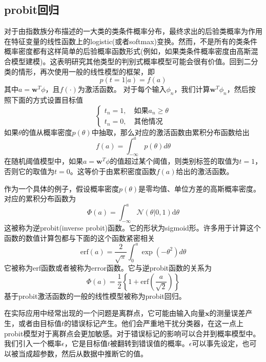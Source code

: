 \subsection*{probit回归}
对于由指数族分布描述的一大类的类条件概率分布，最终求出的后验类概率为作用在特征变量的线性函数上的logistic(或者softmax)变换。然而，不是所有的类条件概率密度都有这样简单的后验概率函数形式(例如，如果类条件概率密度由高斯混合模型建模)。这表明研究其他类型的判别式概率模型可能会很有价值。回到二分类的情形，再次使用一般的线性模型的框架，即
\begin{equation}
	p(t=1|a)=f(a)
\end{equation}
其中$a=\boldsymbol{w}^T\phi$，且$f(\cdot)$为激活函数。
对于每个输入$\phi_n$，我们计算$\boldsymbol{w}^T\phi_n$，然后按照下面的方式设置目标值
\begin{equation}
	\begin{cases}
	t_n=1,\quad \text{如果}a_n\geqslant \theta\\
	t_n=0,\quad \text{其他情况}
	\end{cases}
\end{equation}
如果$\theta$的值从概率密度$p(\theta)$中抽取，那么对应的激活函数由累积分布函数给出
\begin{equation}
	f(a)=\int_{-\infty}^ap(\theta)d\theta
\end{equation}
在随机阈值模型中，如果$a=\boldsymbol{w}^T\phi$的值超过某个阈值，则类别标签的取值为$t=1$，否则它的取值为$t=0$。这等价于由累积密度函数$f(a)$给出的激活函数。

作为一个具体的例子，假设概率密度$p(\theta)$是零均值、单位方差的高斯概率密度。对应的累积分布函数为
\begin{equation}
	\Phi(a)=\int_{-\infty}^{a}\mathcal{N}(\theta |0,1)\mathrm{d}\theta 
\end{equation}
这被称为逆probit(inverse probit)函数。它的形状为sigmoid形。许多用于计算这个函数的数值计算包都与下面的这个函数紧密相关
\begin{equation}
	\mathrm{erf}(a)=\frac{2}{\sqrt{\pi}}\int_0^a\exp(-\theta^2)d\theta
\end{equation}
它被称为erf函数或者被称为error函数。它与逆probit函数的关系为
\begin{equation}
	\Phi(a)=\frac{1}{2}\left\{1+\mathrm{erf}\left(\frac{a}{\sqrt{2}} \right) \right\}
\end{equation}
基于probit激活函数的一般的线性模型被称为probit回归。

在实际应用中经常出现的一个问题是离群点，它可能由输入向量$\boldsymbol{x}$的测量误差产生，或者由目标值$t$的错误标记产生。他们会严重地干扰分类器，在这一点上probit模型对于离群点会更加敏感。对于错误标记的影响可以合并到概率模型中。我们引入一个概率$\epsilon$，它是目标值$t$被翻转到错误值的概率。$\epsilon$可以事先设定，也可以被当成超参数，然后从数据中推断它的值。
